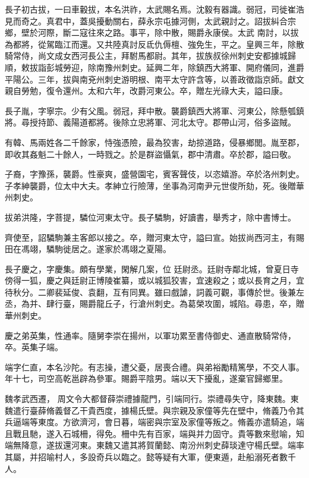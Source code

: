 \begin{pinyinscope}
 長子初古拔，一曰車轂拔，本名洪祚，太武賜名焉。沈毅有器識。弱冠，司徙崔浩見而奇之。真君中，蓋吳擾動關右，薛永宗屯據河側，太武親討之。詔拔糾合宗鄉，壁於河際，斷二寇往來之路。事平，除中散，賜爵永康侯。太武
 南討，以拔為都將，從駕臨江而還。又共陸真討反氐仇傉檀、強免生，平之。皇興三年，除散騎常侍，尚文成女西河長公主，拜駙馬都尉。其年，拔族叔徐州刺史安都據城歸順，敕拔詣彭城勞迎，除南豫州刺史。延興二年，除鎮西大將軍、開府儀同，進爵平陽公。三年，拔與南兗州刺史游明根、南平太守許含等，以善政徵詣京師。獻文親自勞勉，復令還州。太和六年，改爵河東公。卒，贈左光祿大夫，謚曰康。



 長子胤，字寧宗。少有父風。弱冠，拜中散。襲爵鎮西大將軍、河東公，除懸瓠鎮將。尋授持節、義陽道都將。後除立忠將軍、河北太守。郡帶山河，俗多盜賊。



 有韓、馬兩姓各二千餘家，恃強憑險，最為狡害，劫掠道路，侵暴鄉閭。胤至郡，即收其姦魁二十餘人，一時戮之。於是群盜懾氣，郡中清肅。卒於郡，謚曰敬。



 子裔，字豫孫，襲爵。性豪爽，盛營園宅，賓客聲伎，以恣嬉游。卒於洛州刺史。子孝紳襲爵，位太中大夫。孝紳立行險薄，坐事為河南尹元世俊所劾，死。後贈華州刺史。



 拔弟洪隆，字菩提，驎位河東太守。長子驎駒，好讀書，舉秀才，除中書博士。



 齊使至，詔驎駒兼主客郎以接之。卒，贈河東太守，謚曰宣。始拔尚西河主，有賜田在馮翊，驎駒徙居之。遂家於馮翊之夏陽。



 長子慶之，字慶集。頗有學業，閑解几案，位
 廷尉丞。廷尉寺鄰北城，曾夏日寺傍得一狐，慶之與廷尉正博陵崔纂，或以城狐狡害，宜速殺之；或以長育之月，宜待秋分。二卿裴延俊、袁翻，互有同異。雖曰戲謔，詞義可觀，事傳於世。後兼左丞，為并、肆行臺，賜爵龍丘子，行滄州刺史。為葛榮攻圍，城陷。尋患，卒，贈華州刺史。



 慶之弟英集，性通率。隨舅李崇在揚州，以軍功累至書侍御史、通直散騎常侍，卒。英集子端。



 端字仁直，本名沙陀。有志操，遭父憂，居喪合禮。與弟裕勵精篤學，不交人事。年十七，司空高乾邕辟為參軍。賜爵平陰男。端以天下擾亂，遂棄官歸鄉里。



 魏孝武西遷，
 周文令大都督薛崇禮據龍門，引端同行。崇禮尋失守，降東魏。東魏遣行臺薛脩義督乙干貴西度，據楊氏壁。與宗親及家僮等先在壁中，脩義乃令其兵逼端等東度。方欲濟河，會日暮，端密與宗室及家僮等叛之。脩義亦遣騎追，端且戰且馳，遂入石城柵，得免。柵中先有百家，端與并力固守。貴等數來慰喻，知端無降意，遂拔還河東。東魏又遣其將賀蘭懿、南汾州刺史薛琰達守楊氏壁。端率其屬，并招喻村人，多設奇兵以臨之。懿等疑有大軍，便東遁，赴船溺死者數千人。




\end{pinyinscope}
